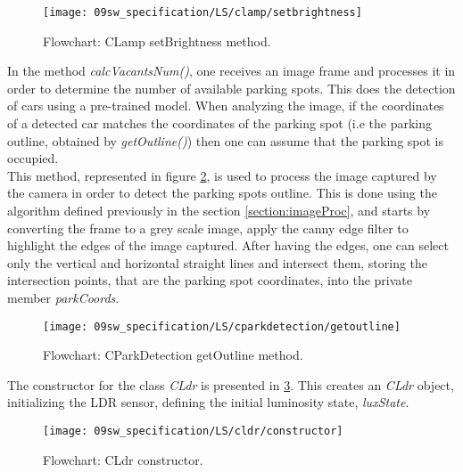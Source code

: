 \begin{figure}[H]
	\centering	
	\texttt{[image: 09sw\_specification/LS/clamp/setbrightness]}
	\caption{Flowchart: CLamp setBrightness method.}
	\label{fig:CLampsetBrightness}
\end{figure}

\clearpage
{}

In the method \textit{calcVacantsNum()}, one receives an image frame and processes it in order to determine the number of available parking spots. This does the detection of cars using a pre-trained model. When analyzing the image, if the coordinates of a detected car matches the coordinates of the parking spot (i.e the parking outline, obtained by \textit{getOutline()}) then one can assume that the parking spot is occupied. \\

This method, represented in figure \ref{fig:CParkDetectiongetoutline}, is used to process the image captured by the camera in order to detect the parking spots outline. This is done using the algorithm defined previously in the section \ref{section:imageProc}, and starts by converting the frame to a grey scale image, apply the canny edge filter to highlight the edges of the image captured. After having the edges, one can select only the vertical and horizontal straight lines and intersect them, storing the intersection points, that are the parking spot coordinates, into the private member \textit{parkCoords}.

\begin{figure}[H]
	\centering			
	\texttt{[image: 09sw\_specification/LS/cparkdetection/getoutline]}
	\caption{Flowchart: CParkDetection getOutline method.}
	\label{fig:CParkDetectiongetoutline}
\end{figure}

\clearpage
{}

The constructor for the class \textit{CLdr} is presented in \ref{fig:CLdrconstructor}. This creates an \textit{CLdr} object, initializing the LDR sensor, defining the initial luminosity state, \textit{luxState}.

\begin{figure}[H]
	\centering
	\texttt{[image: 09sw\_specification/LS/cldr/constructor]}
	\caption{Flowchart: CLdr constructor.}
	\label{fig:CLdrconstructor}
\end{figure}

